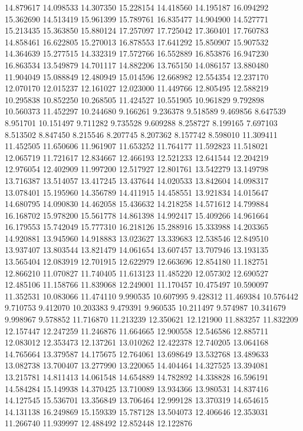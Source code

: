 14.879617
14.098533
14.307350
15.228154
14.418560
14.195187
16.094292
15.362690
14.513419
15.961399
15.789761
16.835477
14.904900
14.527771
15.213435
15.363850
15.880124
17.257097
17.725042
17.360401
17.760783
14.858461
16.622805
15.270013
16.878553
17.641292
15.850907
15.907532
14.364639
15.277515
14.332319
17.572766
16.552889
16.853876
16.947230
16.863534
13.549879
14.701117
14.882206
13.765150
14.086157
13.880480
11.904049
15.088849
12.480949
15.014596
12.668982
12.554354
12.237170
12.070170
12.015237
12.161027
12.023000
11.449766
12.805495
12.588219
10.295838
10.852250
10.268505
11.424527
10.551905
10.961829
9.792898
10.560373
11.452297
10.244680
9.166261
9.236378
9.518589
9.469856
8.647539
8.951701
10.151497
9.711282
9.735528
9.609288
8.258727
8.199165
7.697103
8.513502
8.847450
8.215546
8.207745
8.207362
8.157742
8.598010
11.309411
11.452505
11.650606
11.961907
11.653252
11.764177
11.592823
11.518021
12.065719
11.721617
12.834667
12.466193
12.521233
12.641544
12.204219
12.976054
12.402909
11.997200
12.517927
12.801761
13.542279
13.149798
13.716387
13.514057
13.417245
13.437644
14.020533
13.842604
14.098317
13.078401
15.195960
14.356789
14.411915
14.458551
13.921834
14.015647
14.680795
14.090830
14.462058
15.436632
14.218258
14.571612
14.799884
16.168702
15.978200
15.561778
14.861398
14.992417
15.409266
14.961664
16.179553
15.742049
15.777310
16.218126
15.288916
15.333988
14.203365
14.920881
13.945960
14.918883
13.023627
13.339683
12.538546
12.849510
13.937407
13.803544
13.821479
14.061654
13.607457
13.707946
13.193135
13.565404
12.083919
12.701915
12.622979
12.663696
12.854180
11.182751
12.866210
11.070827
11.740405
11.613123
11.485220
12.057302
12.690527
12.485106
11.158766
11.839068
12.249001
11.170457
10.475497
10.590097
11.352531
10.083066
11.474110
9.990535
10.607995
9.428312
11.469384
10.576442
9.710753
9.412070
10.203383
9.479391
9.960535
10.211497
9.574987
10.341679
9.998967
9.578852
11.716870
11.213239
12.350621
12.121900
11.883257
11.832209
12.157447
12.247259
11.246876
11.664665
12.900558
12.546586
12.885711
12.083012
12.353473
12.137261
13.010262
12.422378
12.740205
13.064168
14.765664
13.379587
14.175675
12.764061
13.698649
13.532768
13.489633
13.082738
13.700407
13.277990
13.220065
14.404464
14.327525
13.394081
13.215781
14.811413
14.061548
14.654889
14.782892
14.338828
16.596191
14.584284
15.149938
14.370425
13.710089
13.934366
13.980531
14.837416
14.127545
15.536701
13.356849
13.706464
12.999128
13.370319
14.654615
14.131138
16.249869
15.159339
15.787128
13.504073
12.406646
12.353031
11.266740
11.939997
12.488492
12.852448
12.122876
